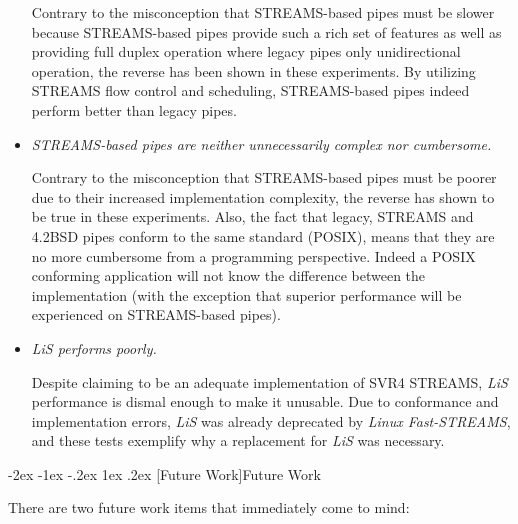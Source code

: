 \documentclass[letterpaper,final,notitlepage,twocolumn,10pt,twoside]{article}
\makeatletter
\renewcommand\section{\@startsection {section}{1}{\z@}%
                                   {-2ex \@plus -1ex \@minus -.2ex}%
                                   {1ex \@plus .2ex}%
                                   {\normalfont\large\bfseries}}
\makeatother
\begin{document}
\begin{itemize}
Contrary to the misconception that STREAMS-based pipes must be slower because
STREAMS-based pipes provide such a rich set of features as well as providing
full duplex operation where legacy pipes only unidirectional operation, the
reverse has been shown in these experiments.  By utilizing STREAMS flow
control and scheduling, STREAMS-based pipes indeed perform better than legacy
pipes.

\item \textit{STREAMS-based pipes are neither unnecessarily complex nor cumbersome.}

Contrary to the misconception that STREAMS-based pipes must be poorer due to
their increased implementation complexity, the reverse has shown to be true in
these experiments.  Also, the fact that legacy, STREAMS and 4.2BSD pipes
conform to the same standard (POSIX), means that they are no more cumbersome
from a programming perspective.  Indeed a POSIX conforming application will
not know the difference between the implementation (with the exception that
superior performance will be experienced on STREAMS-based pipes).

\item \textit{\textsl{LiS} performs poorly.}

Despite claiming to be an adequate implementation of SVR4 STREAMS,
\textsl{LiS} performance is dismal enough to make it unusable.  Due to
conformance and implementation errors, \textsl{LiS} was already deprecated by
\textsl{Linux Fast-STREAMS}, and these tests exemplify why a replacement for
\textsl{LiS} was necessary.

\end{itemize}

\section[Future Work]{Future Work}

There are two future work items that immediately come to mind:
\end{document}
